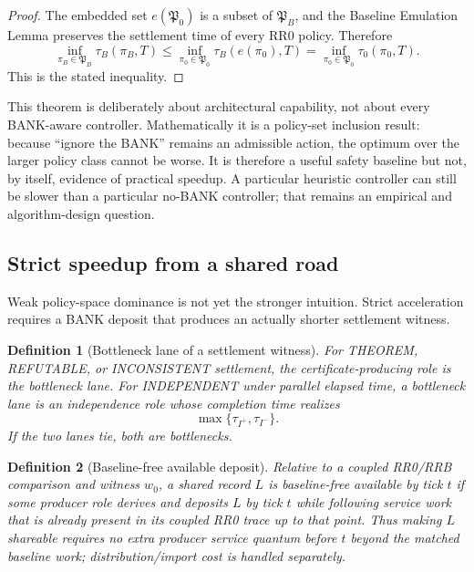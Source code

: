 \documentclass[11pt]{article}
\newtheorem{definition}{Definition}[section]
\begin{document}
\begin{proof}
The embedded set $e(\mathfrak P_0)$ is a subset of $\mathfrak P_B$, and the Baseline Emulation Lemma preserves the settlement time of every RR0 policy. Therefore
\[
\inf_{\pi_B\in\mathfrak P_B}\tau_B(\pi_B,T)
\le
\inf_{\pi_0\in\mathfrak P_0}\tau_B(e(\pi_0),T)
=
\inf_{\pi_0\in\mathfrak P_0}\tau_0(\pi_0,T).
\]
This is the stated inequality.
\end{proof}

This theorem is deliberately about architectural capability, not about every BANK-aware controller. Mathematically it is a policy-set inclusion result: because ``ignore the BANK'' remains an admissible action, the optimum over the larger policy class cannot be worse. It is therefore a useful safety baseline but not, by itself, evidence of practical speedup. A particular heuristic controller can still be slower than a particular no-BANK controller; that remains an empirical and algorithm-design question.

\subsection{Strict speedup from a shared road}

Weak policy-space dominance is not yet the stronger intuition. Strict acceleration requires a BANK deposit that produces an actually shorter settlement witness.

\begin{definition}[Bottleneck lane of a settlement witness]
For THEOREM, REFUTABLE, or INCONSISTENT settlement, the certificate-producing role is the bottleneck lane. For INDEPENDENT under parallel elapsed time, a bottleneck lane is an independence role whose completion time realizes
\[
\max\{\tau_{I^+},\tau_{I^-}\}.
\]
If the two lanes tie, both are bottlenecks.
\end{definition}

\begin{definition}[Baseline-free available deposit]
Relative to a coupled RR0/RRB comparison and witness $w_0$, a shared record $L$ is \emph{baseline-free available by tick $t$} if some producer role derives and deposits $L$ by tick $t$ while following service work that is already present in its coupled RR0 trace up to that point. Thus making $L$ shareable requires no extra producer service quantum before $t$ beyond the matched baseline work; distribution/import cost is handled separately.
\end{definition}
\end{document}
